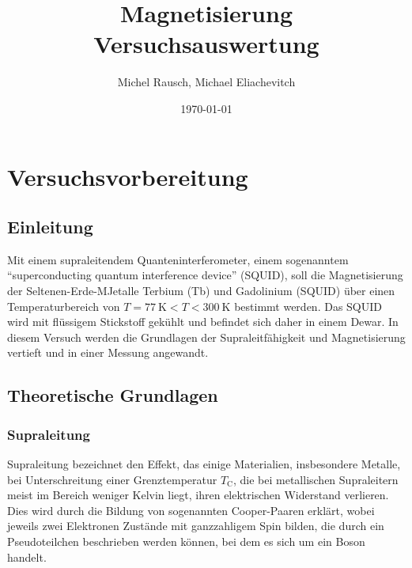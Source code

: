 \documentclass[a4paper,ngerman]{scrartcl}
\title{Magnetisierung\\Versuchsauswertung}
\date{\today}
\author{Michel Rausch, Michael Eliachevitch}
\begin{document}
\maketitle
\tableofcontents
\newpage

\section{Versuchsvorbereitung}

\subsection{Einleitung}


Mit einem supraleitendem Quanteninterferometer, einem sogenanntem
"`superconducting quantum interference device"' (SQUID), soll
die Magnetisierung der Seltenen-Erde-MJetalle Terbium (Tb) und
Gadolinium (SQUID) über einen Temperaturbereich von $T=
\SI{77}{\kelvin} < T < \SI{300}{\kelvin}$ bestimmt werden.
Das SQUID wird mit flüssigem Stickstoff gekühlt und befindet sich
daher in einem Dewar. In diesem Versuch werden die Grundlagen der
Supraleitfähigkeit und Magnetisierung vertieft und in einer Messung
angewandt.


\subsection{Theoretische Grundlagen}

\subsubsection{Supraleitung}

Supraleitung bezeichnet den Effekt, das einige Materialien,
insbesondere Metalle, bei Unterschreitung einer Grenztemperatur
$T_{\mathrm{C}}$, die bei metallischen Supraleitern meist im Bereich
weniger Kelvin liegt, ihren elektrischen Widerstand verlieren.
Dies wird durch die Bildung von sogenannten Cooper-Paaren erklärt,
wobei jeweils zwei Elektronen Zustände mit ganzzahligem
Spin bilden, die durch ein Pseudoteilchen beschrieben werden können,
bei dem es sich um ein Boson handelt.
\end{document}
